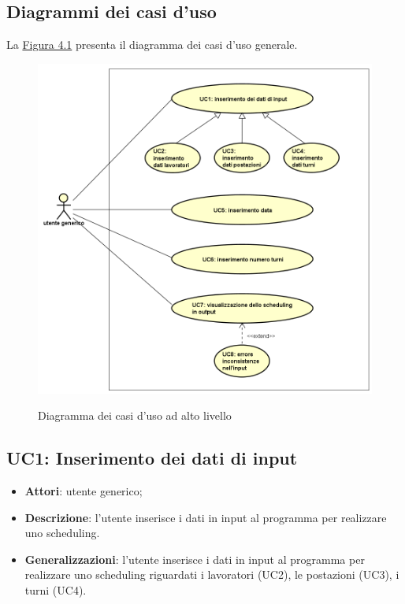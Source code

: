 \subsection{Diagrammi dei casi d'uso}
La \hyperref[fig41]{Figura 4.1} presenta il diagramma dei casi d'uso generale.
\begin{figure}[!h]
    \begin{widepage}
        \label{fig41}
        \includegraphics[width=\textwidth,keepaspectratio]{../immagini/usecase/System.png}
        \caption{Diagramma dei casi d'uso ad alto livello}
    \end{widepage}
\end{figure}
\clearpage
\subsection{UC1: Inserimento dei dati di input}
\label{UC1}
\begin{itemize}
    \item \textbf{Attori}: utente generico;
    \item \textbf{Descrizione}: l'utente inserisce i dati in input al programma per realizzare uno scheduling.
    \item \textbf{Generalizzazioni}: l'utente inserisce i dati in input al programma per realizzare uno scheduling riguardati i lavoratori (UC2), le postazioni (UC3), i turni (UC4).
\end{itemize}


